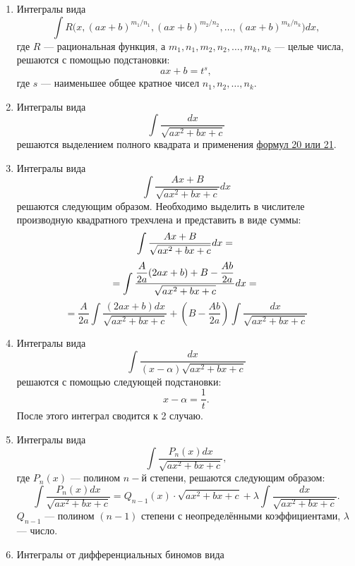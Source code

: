 \documentclass[a4paper,12pt,oneside]{extbook}
\theoremstyle{numbered}
\theoremstyle{unnumbered}
\theoremstyle{named}
\theoremstyle{unnumbered}
\theoremstyle{named}
\theoremstyle{named}
\theoremstyle{named}
\newcommand{\plink}[2]{\hyperref[#1]{\color{blue}\underline{#2}}}
\begin{document}
\begin{enumerate}
    \item {
          Интегралы вида
          \[
              \int R\Big(x, (ax + b)^{m_1 / n_1}, (ax + b)^{m_2 / n_2}, \ldots, (ax + b)^{m_k / n_k}\Big) dx,
          \]
          где \(R\) — рациональная функция, а \(m_1, n_1, m_2, n_2, \ldots, m_k, n_k\) — целые числа, решаются с помощью подстановки:
          \[
              ax + b = t^s,
          \]
          где \(s\) — наименьшее общее кратное чисел \(n_1, n_2, \ldots, n_k\).
          }
    \item {
          Интегралы вида
          \[
              \int \frac{dx}{\sqrt{ax^2 + bx + c}}
          \]
          решаются выделением полного квадрата и применения \plink{sub:Таблица основных интегралов}{формул 20 или 21}.
          }
    \item {
          Интегралы вида
          \[
              \int \frac{Ax + B}{\sqrt{ax^2 + bx + c}}dx
          \]
          решаются следующим образом. Необходимо выделить в числителе производную квадратного трехчлена и представить в виде суммы:
          \[
              \int \frac{Ax + B}{\sqrt{ax^2 + bx + c}}dx = \\
          \]
          \[
              = \int \frac{\dfrac{A}{2a}(2ax + b) + B - \dfrac{Ab}{2a}}{\sqrt{ax^2 + bx + c}} dx = \\
          \]
          \[
              = \frac{A}{2a} \int \frac{(2ax + b) dx}{\sqrt{ax^2 + bx + c}} + (B - \frac{Ab}{2a}) \int \frac{dx}{\sqrt{ax^2 + bx + c}}
          \]
          }
    \item {
          Интегралы вида
          \[
              \int \frac{dx}{(x - \alpha) \sqrt{ax^2 + bx + c}}
          \]
          решаются с помощью следующей подстановки:
          \[
              x - \alpha = \frac{1}{t}.
          \]
          После этого интеграл сводится к 2 случаю.
          }
    \item {
          Интегралы вида
          \[
              \int \frac{P_n(x) dx}{\sqrt{ax^2 + bx + c}},
          \]
          где \(P_n(x)\) — полином \(n-\text{й}\) степени, решаются следующим образом:
          \[
              \int \frac{P_n(x)dx}{\sqrt{ax^2 + bx + c}} = Q_{n - 1}(x) \cdot \sqrt{ax^2 + bx + c} + \lambda \int \frac{dx}{\sqrt{ax^2 + bx + c}}.
          \]
          \(Q_{n - 1}\) — полином \((n - 1)\) степени с неопределёнными коэффициентами, \(\lambda\) — число.
          }
    \item {
          Интегралы от дифференциальных биномов вида
          \[
\]}
\end{enumerate}
\end{document}
